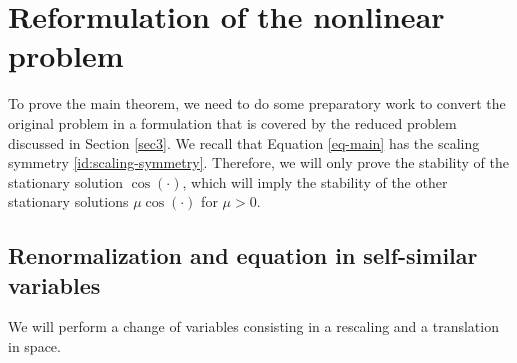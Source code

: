 \documentclass[12pt]{amsart}
\renewcommand{\comment}[1]{\vskip.3cm
\fbox{%
\parbox{0.93\linewidth}{\footnotesize #1}}
\vskip.3cm}
\numberwithin{equation}{section}
\numberwithin{equation}{section}
\begin{document}
 
 
 
  
 
\section{Reformulation of the nonlinear problem}\label{S4}
 
 To prove the main theorem, we need to do some preparatory work to convert the original problem in a formulation that is covered by the reduced problem discussed in Section \ref{sec3}. We recall that Equation \eqref{eq-main} has the scaling symmetry \eqref{id:scaling-symmetry}. Therefore, we will only prove the stability of the stationary solution $\cos(\cdot)$, which will imply the stability of the other stationary solutions $\mu \cos(\cdot)$ for $\mu>0$.
 



\subsection{Renormalization and equation in self-similar variables}

We will perform a change of variables consisting in a rescaling and a translation in space. 
\end{document}

